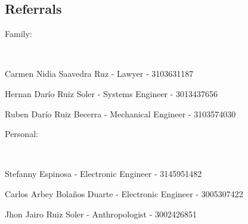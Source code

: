 \documentclass[10pt,a4paper]{article}
\newenvironment{indentsection}[1]%
{\begin{list}{}%
	{\setlength{\leftmargin}{#1}}%
	\item[]%
}
{\end{list}}
\begin{document}
\subsection*{Referrals}
\begin{indentsection}{\parindent}
\begin{description*}
	\item[Family:]
	
	\begin{itemize*}
		\
		\item
		\item Carmen Nidia Saavedra Ruz - Lawyer - 3103631187
		\item Hernan Darío Ruiz Soler - Systems Engineer - 3013437656
		\item Ruben Darío Ruiz Becerra - Mechanical Engineer - 3103574030
	\end{itemize*}

	\item[Personal:]
	
	\begin{itemize*}
		\
		\item
		\item Stefanny Espinosa - Electronic Engineer -  3145951482
		\item Carlos Arbey Bolaños Duarte - Electronic Engineer -  3005307422
		\item Jhon Jairo Ruiz Soler - Anthropologist - 3002426851
	\end{itemize*}
\end{description*}
\end{indentsection}
\end{document}
